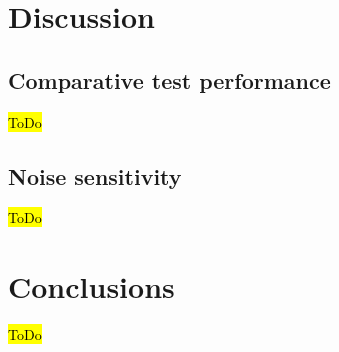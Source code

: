 \documentclass{article}
\begin{document}

\section{Discussion}

\subsection{Comparative test performance}

\hl{ToDo}

\subsection{Noise sensitivity}

\hl{ToDo}



\section{Conclusions}

\hl{ToDo}



\end{document}

